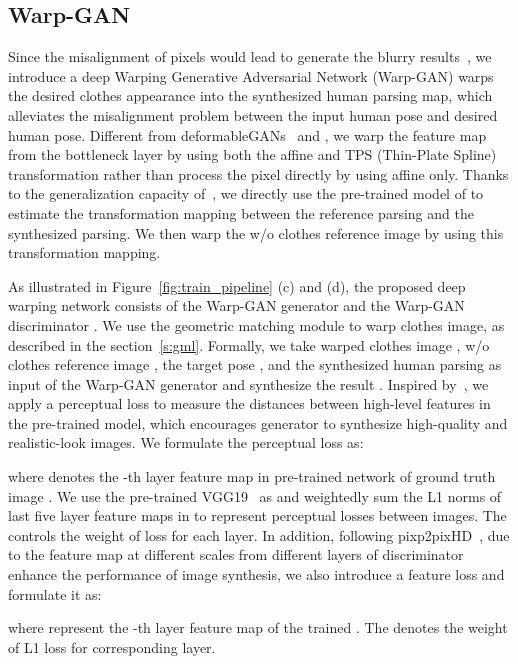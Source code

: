 \documentclass[10pt,twocolumn,letterpaper]{article}
\begin{document}
\subsection{Warp-GAN}
\label{s:wg}
Since the misalignment of pixels would lead to generate the blurry results~\cite{siarohin2017deformable}, we introduce a deep Warping Generative Adversarial Network (Warp-GAN) warps the desired clothes appearance into the synthesized human parsing map, which alleviates the misalignment problem between the input human pose and desired human pose. Different from deformableGANs~\cite{siarohin2017deformable} and \cite{balakrishnan2018synthesizing}, we warp the feature map from the bottleneck layer by using both the affine and TPS (Thin-Plate Spline)~\cite{bookstein1989tps} transformation rather than process the pixel directly by using affine only. Thanks to the generalization capacity of~\cite{Rocco2017geocnn}, we directly use the pre-trained model of \cite{Rocco2017geocnn} to estimate the transformation mapping between the reference parsing and the synthesized parsing. We then warp the w/o clothes reference image by using this transformation mapping. 

As illustrated in Figure~\ref{fig:train_pipeline} (c) and (d), the proposed deep warping network consists of the Warp-GAN generator  and the Warp-GAN discriminator . We use the geometric matching module to warp clothes image, as described in the section~\ref{s:gml}. Formally, we take warped clothes image , w/o clothes reference image , the target pose , and the synthesized human parsing  as input of the Warp-GAN generator and synthesize the result .
Inspired by~\cite{johnson2016perceptual,han2017viton,ledig2016photo}, we apply a perceptual loss to measure the distances between high-level features in the pre-trained model, which encourages generator to synthesize high-quality and realistic-look images. We formulate the perceptual loss as:

where  denotes the -th  layer feature map in pre-trained network  of ground truth image . We use the pre-trained VGG19~\cite{simonyan2015very} as  and weightedly sum the L1 norms of last five layer feature maps in  to represent perceptual losses between images. The  controls the weight of loss for each layer. 
In addition, following pixp2pixHD~\cite{wang2017pix2pixHD}, due to the feature map at different scales from different layers of discriminator enhance the performance of image synthesis, we also introduce a feature loss and formulate it as: 

where  represent the -th  layer feature map of the trained . The  denotes the weight of L1 loss for corresponding layer.
\end{document}
